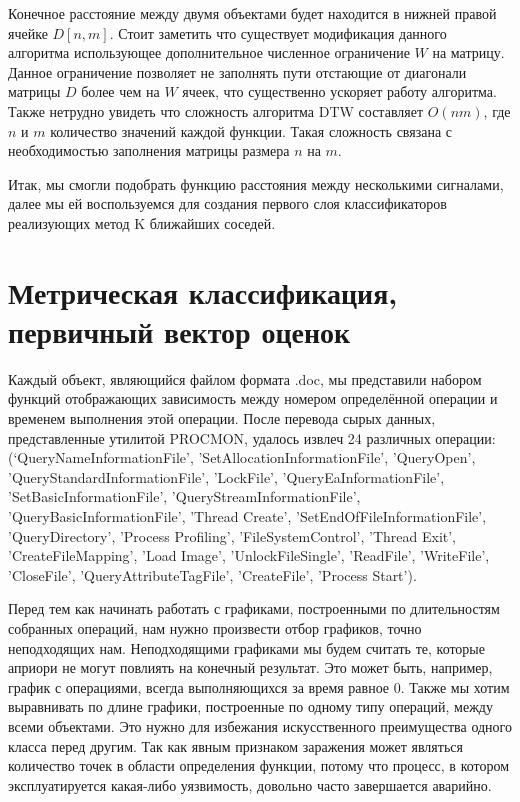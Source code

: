 Конечное расстояние между двумя объектами будет находится в  нижней правой ячейке $D[n, m]$. Стоит заметить что существует модификация данного алгоритма использующее дополнительное численное ограничение $W$ на матрицу. Данное ограничение позволяет не заполнять пути отстающие от диагонали матрицы $D$ более чем на $W$ ячеек, что существенно ускоряет работу алгоритма. Также нетрудно увидеть что сложность алгоритма DTW составляет $O(n m)$, где $n$ и $m$ количество значений каждой функции. Такая сложность связана с необходимостью заполнения матрицы размера $n$ на $m$. 

Итак, мы смогли подобрать функцию расстояния между несколькими сигналами, далее мы ей воспользуемся для создания первого слоя классификаторов реализующих метод K ближайших соседей.

\section{Метрическая классификация, первичный вектор оценок}

Каждый объект, являющийся файлом формата .doc, мы представили набором функций отображающих зависимость между номером определённой операции и временем выполнения этой операции. После перевода сырых данных, представленные утилитой PROCMON, удалось извлеч 24 различных операции: (‘QueryNameInformationFile', 'SetAllocationInformationFile', 'QueryOpen', 'QueryStandardInformationFile', 'LockFile', 'QueryEaInformationFile', 'SetBasicInformationFile', 'QueryStreamInformationFile', 'QueryBasicInformationFile', 'Thread Create', 'SetEndOfFileInformationFile', 'QueryDirectory', 'Process Profiling', 'FileSystemControl', 'Thread Exit', 'CreateFileMapping', 'Load Image', 'UnlockFileSingle', 'ReadFile', 'WriteFile', 'CloseFile', 'QueryAttributeTagFile', 'CreateFile', 'Process Start’). 

Перед тем как начинать работать с графиками, построенными по длительностям собранных операций, нам нужно произвести отбор графиков, точно неподходящих нам. Неподходящими графиками мы будем считать те, которые априори не могут повлиять на конечный результат. Это может быть, например, график с операциями, всегда выполняющихся за время равное 0. Также мы хотим выравнивать по длине графики, построенные по одному типу операций, между всеми объектами. Это нужно для избежания искусственного преимущества одного класса перед другим. Так как явным признаком заражения может являться количество точек в области определения функции, потому что процесс, в котором эксплуатируется какая-либо уязвимость, довольно часто завершается аварийно. 

